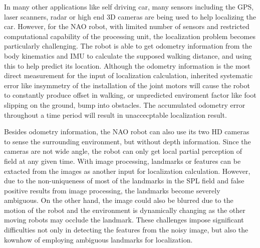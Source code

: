 
In many other applications like self driving car, many sensors including the GPS, laser scanners, radar or high end 3D cameras are being used to help localizing the car. 
However, for the NAO robot, with limited number of sensors and restricted computational capability of the processing unit, the localization problem becomes particularly challenging. The robot is able to get odometry information from the body kinematics and \gls{IMU} to calculate the supposed walking distance, and using this to help predict its location. 
Although the odometry information is the most direct measurement for the input of localization calculation, inherited systematic error like insymmetry of the installation of the joint motors will cause the robot to constantly produce offset in walking, or unpredicted enviroment factor like foot slipping on the ground, bump into obstacles. 
The accumulated odometry error throughout a time period will result in unaccecptable localization result. 

Besides odometry information, the NAO robot can also use its two \gls{HD} cameras to sense the surrounding environment, but without depth information. Since the cameras are not wide angle, the robot can only get local partial perception of field at any given time.
With image processing, landmarks or features can be extacted from the images as another input for localization calculation. However, due to the non-uniqueness of most of the landmarks in the \gls{SPL} field and false positive results from image processing, the landmarks become severely ambiguous. On the other hand, the image could also be blurred due to the motion of the robot and the environment is dynamically changing as the other moving robots may occlude the landmark. These challenges impose significant difficulties not only in detecting the features from the noisy image, but also the kownhow of employing ambiguous landmarks for localization. 


